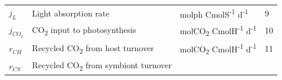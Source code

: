 \documentclass[]{elsarticle} %
\begin{document}
\begin{longtable}[c]{@{}llll@{}}
\begin{minipage}[t]{0.10\columnwidth}\raggedright\strut
\(j_L\)
\strut\end{minipage} &
\begin{minipage}[t]{0.48\columnwidth}\raggedright\strut
Light absorption rate
\strut\end{minipage} &
\begin{minipage}[t]{0.25\columnwidth}\raggedright\strut
molph CmolS\textsuperscript{-1} d\textsuperscript{-1}
\strut\end{minipage} &
\begin{minipage}[t]{0.10\columnwidth}\raggedright\strut
9
\strut\end{minipage}\tabularnewline
\begin{minipage}[t]{0.10\columnwidth}\raggedright\strut
\(j_{CO_2}\)
\strut\end{minipage} &
\begin{minipage}[t]{0.48\columnwidth}\raggedright\strut
CO\textsubscript{2} input to photosynthesis
\strut\end{minipage} &
\begin{minipage}[t]{0.25\columnwidth}\raggedright\strut
molCO\textsubscript{2} CmolH\textsuperscript{-1} d\textsuperscript{-1}
\strut\end{minipage} &
\begin{minipage}[t]{0.10\columnwidth}\raggedright\strut
10
\strut\end{minipage}\tabularnewline
\begin{minipage}[t]{0.10\columnwidth}\raggedright\strut
\(r_{CH}\)
\strut\end{minipage} &
\begin{minipage}[t]{0.48\columnwidth}\raggedright\strut
Recycled CO\textsubscript{2} from host turnover
\strut\end{minipage} &
\begin{minipage}[t]{0.25\columnwidth}\raggedright\strut
molCO\textsubscript{2} CmolH\textsuperscript{-1} d\textsuperscript{-1}
\strut\end{minipage} &
\begin{minipage}[t]{0.10\columnwidth}\raggedright\strut
11
\strut\end{minipage}\tabularnewline
\begin{minipage}[t]{0.10\columnwidth}\raggedright\strut
\(r_{CS}\)
\strut\end{minipage} &
\begin{minipage}[t]{0.48\columnwidth}\raggedright\strut
Recycled CO\textsubscript{2} from symbiont turnover

\end{minipage}
\end{longtable}
\end{document}
